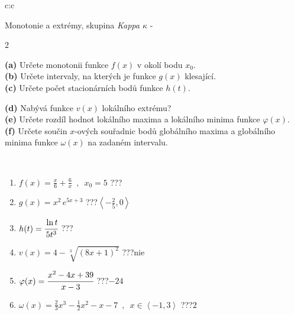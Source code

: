 \documentclass[10pt]{report}
\begin{document}
\newpage
\thispagestyle{empty}
\begin{tabular}{c:c}
\begin{minipage}[c][104.5mm][t]{0.5\linewidth}
\begin{center}
\vspace{7mm}
{\huge Monotonie a extrémy, skupina \textit{Kappa $\kappa$} -}\\[5mm]
\begin{minipage}{0.95\linewidth}
\begin{center}
{\small \begin{multicols}{2} \raggedright
\textbf{(a)} Určete monotonii funkce \(f(x)\) v okolí bodu \(x_0\). \\[1mm]
\textbf{(b)} Určete intervaly, na kterých je funkce \(g(x)\) klesající. \\[1mm]
\textbf{(c)} Určete počet stacionárních bodů funkce \(h(t)\). \par \columnbreak
\textbf{(d)} Nabývá funkce \(v(x)\) lokálního extrému? \\[1mm]
\textbf{(e)} Určete rozdíl hodnot lokálního maxima a lokálního minima funkce \(\varphi(x)\). \\[1mm]
\textbf{(f)} Určete součin \(x\)-ových souřadnic bodů globálního maxima a globálního minima funkce \(\omega(x)\) na zadaném intervalu. \\[1mm]
\end{multicols}
}
\end{center}
\end{minipage}
\\[4mm]
\begin{minipage}{0.79\linewidth}
\begin{center}
\begin{varwidth}{\linewidth}
\begin{enumerate}
\normalsize
\item $f(x)=\frac{x}{6}+\frac{6}{x} \enspace , \enspace x_0=5$\quad \dotfill\; ???\;\dotfill \quad {}
\item $g(x)=x^2\, e^{5x+3}$\quad \dotfill\; ???\;\dotfill \quad $\left\langle-\frac{2}{5} , 0\right\rangle$
\item $h(t)=\cfrac{\ln t}{5t^3}$\quad \dotfill\; ???\;\dotfill {}
\item $v(x)=4-\sqrt[3]{(8x+1)^2}$\quad \dotfill\; ???\;\dotfill \quad $\text{nie}$
\item $\varphi(x)=\cfrac{x^2-4x+39}{x-3}$\quad \dotfill\; ???\;\dotfill \quad $-24$
\item $\omega(x)=\frac{2}{3}x^3-\frac{1}{2}x^2-x-7 \enspace , \enspace x\in\left\langle-1 , 3\right\rangle$\quad \dotfill\; ???\;\dotfill \quad $2$

\end{enumerate}
\end{varwidth}
\end{center}
\end{minipage}
\end{center}
\end{minipage}
\end{tabular}
\end{document}
